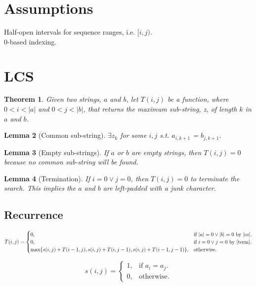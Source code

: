 \documentclass{article}
\newtheorem{theorem}{Theorem}[section]
\newtheorem{lemma}[theorem]{Lemma}
\begin{document}
	\section{Assumptions}
	Half-open intervals for sequence ranges, i.e. $[i,j)$.\\
	0-based indexing.
	
	\section{LCS}
	\begin{theorem}
	Given two strings, $a$ and $b$, let $T(i, j)$ be a function, where $0 < i < |a|$ and $0 < j < |b|$, that returns the 
	maximum sub-string, z, of length $k$ in $a$ and $b$.
	\end{theorem}
	
	\begin{lemma} [Common sub-string]
	\label{zk}	
	$\exists z_k$ for some $i, j$ s.t. $a_{i, k+1}$ = $b_{j, k+1}$.
	\end{lemma}
	
	\begin{lemma} [Empty sub-strings]
	\label{cs}	
	If $a$ or $b$ are empty strings, then $T(i,j)=0$ because no common sub-string will be found.
	\end{lemma}
	
	\begin{lemma} [Termination]
	\label{term}	
	If $i=0 \vee j=0$, then $T(i,j)=0$ to terminate the search. This implies the $a$ and $b$ are left-padded with a junk character.
	\end{lemma}
	
	\subsection{Recurrence}
	 \begin{equation}
	T(i, j)=			
	\begin{cases}
	0, & \text{if $|a|=0 \vee |b|=0$ by \ref{cs}}.\\
	0, & \text{if $i=0 \vee j=0$ by \ref{term}}.\\	
	\text{max}\{s(i,j)+T(i-1,j), s(i,j)+T(i,j-1), s(i,j)+T(i-1,j-1)\}, & \text{otherwise.}				
	\end{cases}
	\end{equation}
	
	\begin{equation}
	s(i,j)=
	\begin{cases}
	1, & \text{if } a_i = a_j.\\
	0, & \text{otherwise.}
	\end{cases}
	\end{equation}
	
\end{document}
